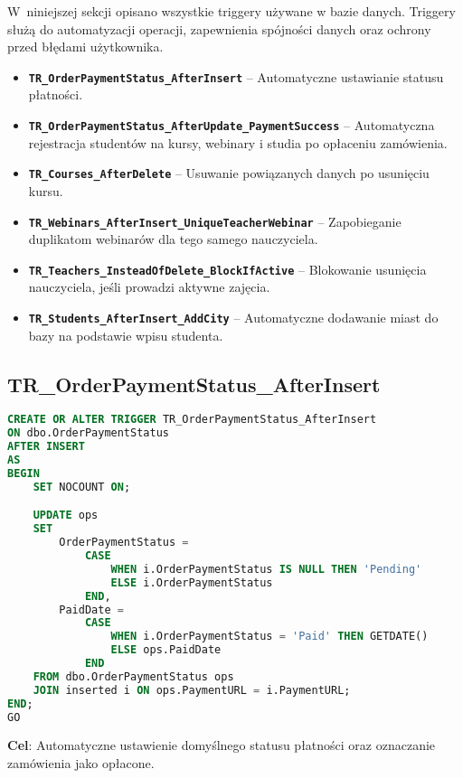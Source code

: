 \documentclass[12pt]{article}
\begin{document}
W~niniejszej sekcji opisano wszystkie triggery używane w bazie danych. Triggery służą do 
automatyzacji operacji, zapewnienia spójności danych oraz ochrony przed błędami użytkownika.

\begin{itemize}
    \item \textbf{\texttt{TR\_OrderPaymentStatus\_AfterInsert}}  
          – Automatyczne ustawianie statusu płatności.
    \item \textbf{\texttt{TR\_OrderPaymentStatus\_AfterUpdate\_PaymentSuccess}}  
          – Automatyczna rejestracja studentów na kursy, webinary i studia po opłaceniu zamówienia.
    \item \textbf{\texttt{TR\_Courses\_AfterDelete}}  
          – Usuwanie powiązanych danych po usunięciu kursu.
    \item \textbf{\texttt{TR\_Webinars\_AfterInsert\_UniqueTeacherWebinar}}  
          – Zapobieganie duplikatom webinarów dla tego samego nauczyciela.
    \item \textbf{\texttt{TR\_Teachers\_InsteadOfDelete\_BlockIfActive}}  
          – Blokowanie usunięcia nauczyciela, jeśli prowadzi aktywne zajęcia.
    \item \textbf{\texttt{TR\_Students\_AfterInsert\_AddCity}}  
          – Automatyczne dodawanie miast do bazy na podstawie wpisu studenta.
\end{itemize}

\subsection{TR\_OrderPaymentStatus\_AfterInsert}
\begin{lstlisting}[language=SQL]
CREATE OR ALTER TRIGGER TR_OrderPaymentStatus_AfterInsert
ON dbo.OrderPaymentStatus
AFTER INSERT
AS
BEGIN
    SET NOCOUNT ON;

    UPDATE ops
    SET
        OrderPaymentStatus =
            CASE
                WHEN i.OrderPaymentStatus IS NULL THEN 'Pending'
                ELSE i.OrderPaymentStatus
            END,
        PaidDate =
            CASE
                WHEN i.OrderPaymentStatus = 'Paid' THEN GETDATE()
                ELSE ops.PaidDate
            END
    FROM dbo.OrderPaymentStatus ops
    JOIN inserted i ON ops.PaymentURL = i.PaymentURL;
END;
GO
\end{lstlisting}

\noindent \textbf{Cel}: Automatyczne ustawienie domyślnego statusu płatności oraz oznaczanie zamówienia jako opłacone.  
\end{document}
